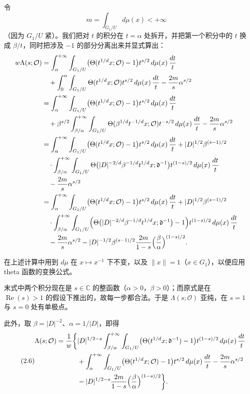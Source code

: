 令
\[
m=\int_{G_1/U}d\mu(x)<+\infty
\]
（因为 $G_1/U$ 紧）。我们把对 $t$ 的积分在 $t=\alpha$ 处拆开，并把第一个积分中的 $t$ 换成 $\beta/t$，同时把涉及 $-1$ 的部分分离出来并显式算出：
\begin{align*}
w\Lambda(s;\mathcal{O})&=\int_\alpha^{+\infty}\int_{G_1/U}\bigl(\Theta(t^{1/d}x;\mathcal{O})-1\bigr)t^{s/2}\,d\mu(x)\,\frac{dt}{t}\\
&\quad+\int_0^{\alpha}\int_{G_1/U}\Theta(t^{1/d}x;\mathcal{O})t^{s/2}\,d\mu(x)\,\frac{dt}{t}-\frac{2m}{s}\alpha^{s/2}\\
&=\int_\alpha^{+\infty}\int_{G_1/U}\bigl(\Theta(t^{1/d}x;\mathcal{O})-1\bigr)t^{s/2}\,d\mu(x)\,\frac{dt}{t}\\
&\quad+\beta^{s/2}\int_{\beta/\alpha}^{+\infty}\int_{G_1/U}\Theta(\beta^{1/d}t^{-1/d}x;\mathcal{O})t^{-s/2}\,d\mu(x)\,\frac{dt}{t}-\frac{2m}{s}\alpha^{s/2}\\
&=\int_\alpha^{+\infty}\int_{G_1/U}\bigl(\Theta(t^{1/d}x;\mathcal{O})-1\bigr)t^{s/2}\,d\mu(x)\,\frac{dt}{t}+|D|^{1/2}\beta^{(s-1)/2}\\
&\quad\cdot\int_{\beta/\alpha}^{+\infty}\int_{G_1/U}\Theta\bigl(|D|^{-2/d}\beta^{-1/d}t^{1/d}x;\mathfrak{d}^{-1}\bigr)t^{(1-s)/2}\,d\mu(x)\,\frac{dt}{t}\\
&\quad-\frac{2m}{s}\alpha^{s/2}\\
&=\int_\alpha^{+\infty}\int_{G_1/U}\bigl(\Theta(t^{1/d}x;\mathcal{O})-1\bigr)t^{s/2}\,d\mu(x)\,\frac{dt}{t}+|D|^{1/2}\beta^{(s-1)/2}\\
&\quad\cdot\int_{\beta/\alpha}^{+\infty}\int_{G_1/U}\Bigl(\Theta\bigl(|D|^{-2/d}\beta^{-1/d}t^{1/d}x;\mathfrak{d}^{-1}\bigr)-1\Bigr)t^{(1-s)/2}\,d\mu(x)\,\frac{dt}{t}\\
&\quad-\frac{2m}{s}\alpha^{s/2}-|D|^{-1/2}\beta^{(s-1)/2}\frac{2m}{1-s}\Bigl(\frac{\beta}{\alpha}\Bigr)^{(1-s)/2}.
\end{align*}

在上述计算中用到 $d\mu$ 在 $x\mapsto x^{-1}$ 下不变，以及 $\|x\|=1$（$x\in G_1$），以便应用 theta 函数的变换公式。

末式中两个积分现在是 $s\in\mathbb{C}$ 的整函数（$\alpha>0$，$\beta>0$）；而原式是在 $\operatorname{Re}(s)>1$ 的假设下推出的，故每一步都合法。于是 $\Lambda(s;\mathcal{O})$ 亚纯，在 $s=1$ 与 $s=0$ 处有单极点。

此外，取 $\beta=|D|^{-2}$、$\alpha=1/|D|$，即得
\begin{equation}\tag{2.6}\label{c2:eq:2.6}
\begin{aligned}
\Lambda(s;\mathcal{O})=\frac{1}{w}\biggl\{&|D|^{1/2-s}\int_{\beta/\alpha}^{+\infty}\int_{G_1/U}\bigl(\Theta(t^{1/d}x;\mathfrak{d}^{-1})-1\bigr)t^{(1-s)/2}\,d\mu(x)\,\frac{dt}{t}\\
&+\int_{\alpha}^{+\infty}\int_{G_1/U}\bigl(\Theta(t^{1/d}x;\mathcal{O})-1\bigr)t^{s/2}\,d\mu(x)\,\frac{dt}{t}-\frac{2m}{s}\alpha^{s/2}\\
&-|D|^{1/2-s}\frac{2m}{1-s}\Bigl(\frac{\beta}{\alpha}\Bigr)^{(1-s)/2}\biggr\}.
\end{aligned}
\end{equation}

